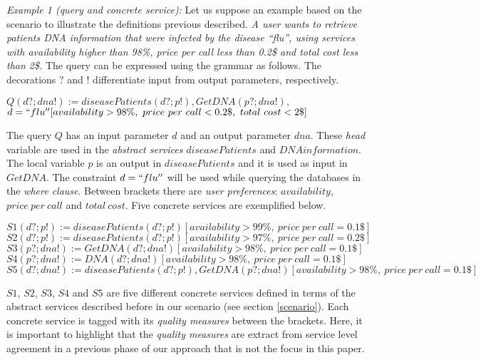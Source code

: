 %
\noindent \textit{Example 1 (query and concrete service):} Let us suppose an example based on the scenario to illustrate the definitions previous described. 
\textit{A user wants to retrieve patients DNA information that were infected by the disease ``flu'', using services with availability higher than 98\%, price per call less than 0.2\$ and total cost less than 2\$.}
The query can be expressed using the grammar as follows. The decorations $?$ and $!$ differentiate input from output parameters, respectively. 
\begin{center}
$Q(d?; dna!) := diseasePatients(d?; p!), GetDNA(p?; dna!),$
\\
$d = ``flu'' [availability > 98\%, \ price \ per \ call < 0.2\$, \ total \ cost < 2\$]$
\end{center}
The query $Q$ has an input parameter $d$ and an output parameter $dna$. 
These \textit{head} variable are used in the \textit{abstract services} $diseasePatients$ and $DNAinformation$. 
The local variable $p$ is an output in $diseasePatients$ and it is used as input in $GetDNA$.
The constraint $d = ``flu''$ will be used while querying the databases in the \textit{where clause}.
Between brackets there are \textit{user preferences}: $availability$, $price \ per \ call$ and $total \ cost$.
Five concrete services are exemplified below. 
\begin{flushleft}
\small
$S1(d?; p!) := diseasePatients(d?; p!)[availability > 99\%, \ price \ per \ call = 0.1\$]$ 
\\
$S2(d?; p!) := diseasePatients(d?; p!)[availability > 97\%, \ price \ per \ call = 0.2\$]$
\\
$S3(p?; dna!) := GetDNA(d?; dna!)[availability > 98\%, \ price \ per \ call = 0.1\$]$
\\
$S4(p?; dna!) := DNA(d?; dna!)[availability > 98\%, \ price \ per \ call = 0.1\$]$
\\
$S5(d?; dna!) := diseasePatients(d?; p!), GetDNA(p?; dna!)[availability > 98\%, \ price \ per \ call = 0.1\$]$
\end{flushleft}
$S1$, $S2$, $S3$, $S4$ and $S5$ are five different concrete services defined in terms of the abstract services described before in our scenario (see section \ref{scenario}). 
Each concrete service is tagged with its \textit{quality measures} between the brackets. 
Here, it is important to highlight that the \textit{quality measures} are extract from service level agreement in a previous phase of our approach that is not the focus in this paper.

